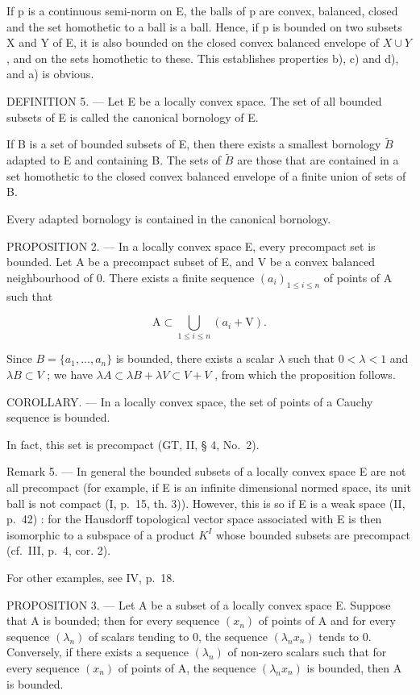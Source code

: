 If p is a continuous semi-norm on E, the balls of p are convex, balanced, closed and the set homothetic to a ball is a ball. Hence, if p is bounded on two subsets X and Y of E, it is also bounded on the closed convex balanced envelope of \(X \cup Y\) , and on the sets homothetic to these. This establishes properties b), c) and d), and a) is obvious.

DEFINITION 5. --- Let E be a locally convex space. The set of all bounded subsets of E is called the canonical bornology of E.

If B is a set of bounded subsets of E, then there exists a smallest bornology \(\tilde{B}\) adapted to E and containing B. The sets of \(\tilde{B}\) are those that are contained in a set homothetic to the closed convex balanced envelope of a finite union of sets of B.

Every adapted bornology is contained in the canonical bornology.

PROPOSITION 2. --- In a locally convex space E, every precompact set is bounded. Let A be a precompact subset of E, and V be a convex balanced neighbourhood of 0. There exists a finite sequence \((a_{i})_{1\leqslant i\leqslant n}\) of points of A such that

\[
\mathrm{A} \subset \bigcup_ {1 \leqslant i \leqslant n} (a _ {i} + \mathrm{V}).
\]

Since \(B = \{a_{1}, ..., a_{n}\}\) is bounded, there exists a scalar \(\lambda\) such that \(0 < \lambda < 1\) and \(\lambda B \subset V\) ; we have \(\lambda A \subset \lambda B + \lambda V \subset V + V\) , from which the proposition follows.

COROLLARY. --- In a locally convex space, the set of points of a Cauchy sequence is bounded.

In fact, this set is precompact (GT, II, § 4, No.~2).

Remark 5. --- In general the bounded subsets of a locally convex space E are not all precompact (for example, if E is an infinite dimensional normed space, its unit ball is not compact (I, p.~15, th. 3)). However, this is so if E is a weak space (II, p.~42) : for the Hausdorff topological vector space associated with E is then isomorphic to a subspace of a product \(K^{I}\) whose bounded subsets are precompact (cf.~III, p.~4, cor. 2).

For other examples, see IV, p.~18.

PROPOSITION 3. --- Let A be a subset of a locally convex space E. Suppose that A is bounded; then for every sequence \((x_{n})\) of points of A and for every sequence \((\lambda_{n})\) of scalars tending to 0, the sequence \((\lambda_{n}x_{n})\) tends to 0. Conversely, if there exists a sequence \((\lambda_{n})\) of non-zero scalars such that for every sequence \((x_{n})\) of points of A, the sequence \((\lambda_{n}x_{n})\) is bounded, then A is bounded.

